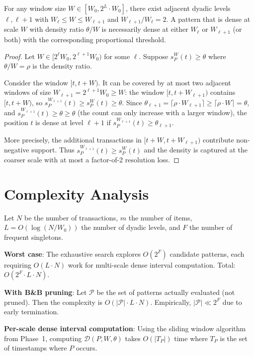 \begin{theorem}\label{thm:dyadic_complete}
For any window size $W \in [W_0, 2^L \cdot W_0]$, there exist adjacent
dyadic levels $\ell, \ell+1$ with $W_\ell \leq W \leq W_{\ell+1}$
and $W_{\ell+1} / W_\ell = 2$.
A pattern that is dense at scale $W$ with density ratio
$\theta / W$ is necessarily dense at either $W_\ell$ or $W_{\ell+1}$
(or both) with the corresponding proportional threshold.
\end{theorem}

\begin{proof}
Let $W \in [2^\ell W_0, 2^{\ell+1} W_0)$ for some $\ell$.
Suppose $s_P^W(t) \geq \theta$ where $\theta/W = \rho$ is the density ratio.

Consider the window $[t, t+W)$. It can be covered by at most two
adjacent windows of size $W_{\ell+1} = 2^{\ell+1} W_0 \geq W$:
the window $[t, t+W_{\ell+1})$ contains $[t, t+W)$, so
$s_P^{W_{\ell+1}}(t) \geq s_P^W(t) \geq \theta$.
Since $\theta_{\ell+1} = \lceil \rho \cdot W_{\ell+1} \rceil
\geq \lceil \rho \cdot W \rceil = \theta$,
and $s_P^{W_{\ell+1}}(t) \geq \theta \geq \theta$ (the count can
only increase with a larger window), the position $t$ is dense at level $\ell+1$
if $s_P^{W_{\ell+1}}(t) \geq \theta_{\ell+1}$.

More precisely, the additional transactions in
$[t+W, t+W_{\ell+1})$ contribute non-negative support.
Thus $s_P^{W_{\ell+1}}(t) \geq s_P^W(t)$ and the density is captured
at the coarser scale with at most a factor-of-2 resolution loss.
\end{proof}

\section{Complexity Analysis}\label{sec:complexity}

\begin{theorem}\label{thm:complexity}
Let $N$ be the number of transactions, $m$ the number of items,
$L = O(\log(N/W_0))$ the number of dyadic levels,
and $F$ the number of frequent singletons.

\textbf{Worst case}:
The exhaustive search explores $O(2^F)$ candidate patterns,
each requiring $O(L \cdot N)$ work for multi-scale dense interval computation.
Total: $O(2^F \cdot L \cdot N)$.

\textbf{With B\&B pruning}:
Let $\mathcal{P}$ be the set of patterns actually evaluated
(not pruned). Then the complexity is $O(|\mathcal{P}| \cdot L \cdot N)$.
Empirically, $|\mathcal{P}| \ll 2^F$ due to early termination.

\textbf{Per-scale dense interval computation}:
Using the sliding window algorithm from Phase~1,
computing $\mathcal{D}(P, W, \theta)$ takes $O(|T_P|)$ time
where $T_P$ is the set of timestamps where $P$ occurs.
\end{theorem}

